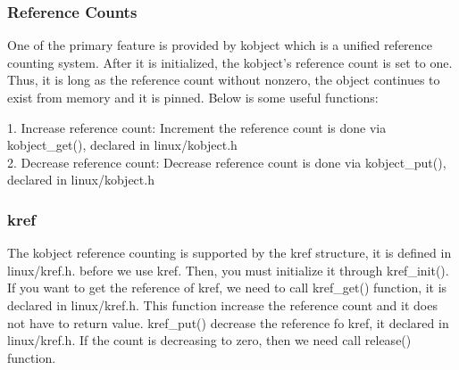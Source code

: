 \documentclass[10pt,draftclsnofoot,peerreview ,letterpaper,onecolumn,]{IEEEtran}
\begin{document}
	\subsubsection{Reference Counts}
	One of the primary feature is provided by kobject which is a unified reference counting system. After it is initialized, the kobject's reference count is set to one. Thus, it is long as the reference count without nonzero, the object continues to exist from memory and it is pinned. Below is some useful functions:

		1. Increase reference count: Increment the reference count is done via kobject\_get(), declared in linux/kobject.h\\
	    2. Decrease reference count: Decrease reference count is done via kobject\_put(), declared in linux/kobject.h\\

	\subsubsection{kref}
	The kobject reference counting is supported by the kref structure, it is defined in linux/kref.h. before we use kref. Then, you must initialize it through kref\_init(). If you want to get the reference of kref, we need to call kref\_get() function, it is declared in linux/kref.h. This function increase the reference count and it does not have to return value. kref\_put() decrease the reference fo kref, it declared in linux/kref.h. If the count is decreasing to zero, then we need call release() function.
	
\end{document}
